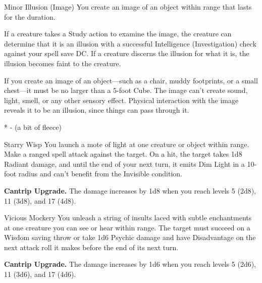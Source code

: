 \begin{Spell}[
    level=Cantrip,
    time=1 Action,
    range=30 ft. (5 ft. *),
    components={S, M*},
    duration=1 Minute,
    school=Illusion,
    attack=None,
    effect=Control
]{Minor Illusion (Image)}
You create an image of an object within range that lasts for the duration.

If a creature takes a Study action to examine the image, the creature can determine that it is an illusion with a successful Intelligence (Investigation) check against your spell save DC. If a creature discerns the illusion for what it is, the illusion becomes faint to the creature.

If you create an image of an object—such as a chair, muddy footprints, or a small chest—it must be no larger than a 5-foot Cube. The image can't create sound, light, smell, or any other sensory effect. Physical interaction with the image reveals it to be an illusion, since things can pass through it.

* - (a bit of fleece)
\end{Spell}


\begin{Spell}[
    level=Cantrip,
    time=1 Action,
    range=60 ft.,
    components={V, S},
    duration=Instantaneous,
    school=Evocation,
    attack=Ranged,
    effect=Radiant
]{Starry Wisp}
You launch a mote of light at one creature or object within range. Make a ranged spell attack against the target. On a hit, the target takes 1d8 Radiant damage, and until the end of your next turn, it emits Dim Light in a 10-foot radius and can't benefit from the Invisible condition.

\textbf{Cantrip Upgrade.} The damage increases by 1d8 when you reach levels 5 (2d8), 11 (3d8), and 17 (4d8).
\end{Spell}


\begin{Spell}[
    level=Cantrip,
    time=1 Action,
    range=60 ft.,
    components={V},
    duration=Instantaneous,
    school=Enchantment,
    attack=WIS Save,
    effect=Psychic
]{Vicious Mockery}
You unleash a string of insults laced with subtle enchantments at one creature you can see or hear within range. The target must succeed on a Wisdom saving throw or take 1d6 Psychic damage and have Disadvantage on the next attack roll it makes before the end of its next turn.

\textbf{Cantrip Upgrade.} The damage increases by 1d6 when you reach levels 5 (2d6), 11 (3d6), and 17 (4d6).
\end{Spell}


